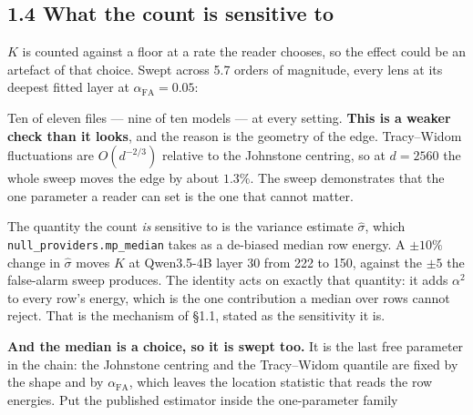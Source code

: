 \documentclass[10pt,letterpaper,twocolumn]{article}
\begin{document}
\subsection{1.4 What the count is sensitive to}\label{14-what-the-count-is-sensitive-to}

\(K\) is counted against a floor at a rate the reader chooses, so the effect could be an artefact of
that choice. Swept across 5.7 orders of magnitude, every lens at its deepest fitted layer
at \(\alpha_{\text{FA}}=0.05\):


Ten of eleven files --- nine of ten models --- at every setting. \textbf{This is a weaker check than it
looks}, and the reason is the geometry of the edge. Tracy--Widom
fluctuations are \(O(d^{-2/3})\) relative to the Johnstone centring, so at \(d=2560\) the whole sweep
moves the edge by about \(1.3\%\). The sweep demonstrates that the one parameter a reader can set is
the one that cannot matter.

The quantity the count \emph{is} sensitive to is the variance estimate \(\hat\sigma\), which
\texttt{null\_\allowbreak{}providers.\allowbreak{}mp\_\allowbreak{}median} takes as a de-biased median row energy. A \(\pm10\%\) change in \(\hat\sigma\) moves
\(K\) at Qwen3.5-4B layer 30 from 222 to 150, against the \(\pm5\) the false-alarm sweep produces. The
identity acts on exactly that quantity: it adds \(\alpha^2\) to every row's energy, which is the one
contribution a median over rows cannot reject. That is the mechanism of §1.1, stated as the
sensitivity it is.

\textbf{And the median is a choice, so it is swept too.} It is the last free parameter in the chain: the
Johnstone centring and the Tracy--Widom quantile are fixed by the shape and by \(\alpha_{\text{FA}}\),
which leaves the location statistic that reads the row energies. Put the published estimator inside
the one-parameter family
\end{document}
